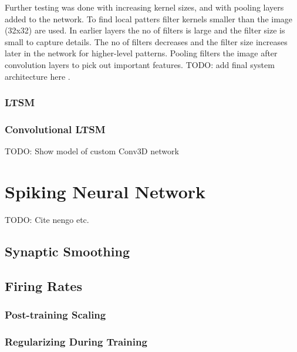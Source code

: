 Further testing was done with increasing kernel sizes, and with pooling layers added to the network. To find local patters filter kernels smaller than the image (32x32) are used. In earlier layers the no of filters is
large and the filter size is small to capture details. The no
of filters decreases and the filter size increases later in the
network for higher-level patterns. Pooling filters the image
after convolution layers to pick out important features. \color{red} TODO: add final system architecture here \color {black}.

\subsubsection{LTSM}

\subsubsection{Convolutional LTSM}

\color{red} TODO: Show model of custom Conv3D network \color{black}

\section{Spiking Neural Network}

\color{red} TODO: Cite nengo etc. \color{black}

\subsection{Synaptic Smoothing}

\subsection{Firing Rates}

\subsubsection{Post-training Scaling}

\subsubsection{Regularizing During Training}